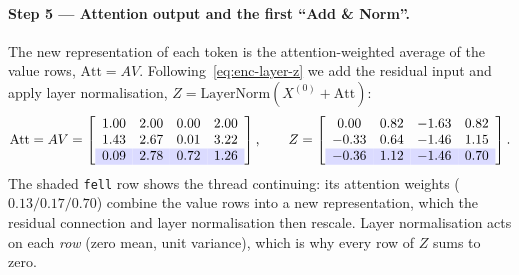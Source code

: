\begin{deepdive}
\paragraph{Step 5 --- Attention output and the first ``Add \& Norm''.}
The new representation of each token is the attention-weighted average of the value
rows, $\mathrm{Att} = A V$.  Following~\eqref{eq:enc-layer-z} we add the residual
input and apply layer normalisation, $Z = \mathrm{LayerNorm}\!\left(X^{(0)} +
\mathrm{Att}\right)$:
\begin{equation*}
  \mathrm{Att} = AV =
  \left[\begin{array}{cccc}
    1.00 & 2.00 & 0.00 & 2.00\\
    1.43 & 2.67 & 0.01 & 3.22\\
    \rowcolor{blue!14} 0.09 & 2.78 & 0.72 & 1.26
  \end{array}\right],
  \qquad
  Z =
  \left[\begin{array}{cccc}
    0.00 & 0.82 & -1.63 & 0.82\\
    -0.33 & 0.64 & -1.46 & 1.15\\
    \rowcolor{blue!14} -0.36 & 1.12 & -1.46 & 0.70
  \end{array}\right].
\end{equation*}
The shaded \texttt{fell} row shows the thread continuing: its attention weights
($0.13/0.17/0.70$) combine the value rows into a new representation, which the residual
connection and layer normalisation then rescale.  Layer normalisation acts on each
\emph{row} (zero mean, unit variance), which is why every row of $Z$ sums to zero.


\end{deepdive}

